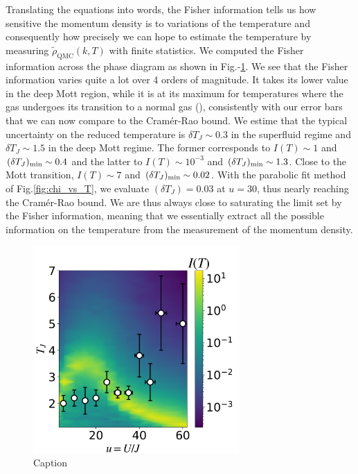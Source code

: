 \noindent Translating the equations into words, the Fisher information tells us how sensitive the momentum density is to variations of the temperature and consequently how precisely we can hope to estimate the temperature by measuring  $\tilde{\rho}_{\mathrm{QMC}}(k, T)$ with finite statistics. We computed the Fisher information across the phase diagram as shown in Fig.-\ref{fig:fisher_info}. We see that the Fisher information varies quite a lot over 4 orders of magnitude. It takes its lower value in the deep Mott region, while it is at its maximum for temperatures where the gas undergoes its transition to a normal gas (), consistently with our error bars that we can now compare to the Cramér-Rao bound. We estime that the typical uncertainty on the reduced temperature is $\delta T_J  \sim 0.3$ in the superfluid regime and $\delta T_J  \sim 1.5$ in the deep Mott regime. The former corresponds to $I(T) \sim 1$ and $(\delta T_J)_{\rm{min}} \sim 0.4$ and the latter to  $I(T) \sim 10^{-3}$ and $(\delta T_J)_{\rm{min}} \sim 1.3$. Close to the Mott transition, $I(T) \sim 7$ and $(\delta T_J)_{\rm{min}} \sim 0.02$. With the parabolic fit method of Fig.\ref{fig:chi_vs_T}, we evaluate $(\delta T_J)=0.03$ at $u=30$, thus nearly reaching the Cramér-Rao bound. We are thus always close to saturating the limit set by the Fisher information, meaning that we essentially extract all the possible information on the temperature from the measurement of the momentum density.

\begin{figure}
    \centering
    \includegraphics[width=0.7\textwidth]{Fig/Chapter3/fisher_info.png}
    \caption{Caption}
    \label{fig:fisher_info}
\end{figure}


